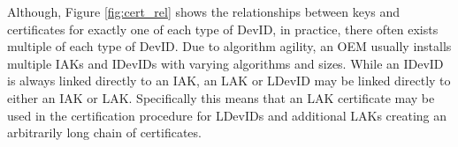 \vspace{2em}
Although, Figure \ref{fig:cert_rel} shows the relationships between keys and certificates for exactly one of each type of DevID, in practice, there often exists multiple of each type of DevID. Due to algorithm agility, an OEM usually installs multiple IAKs and IDevIDs with varying algorithms and sizes. While an IDevID is always linked directly to an IAK, an LAK or LDevID may be linked directly to either an IAK or LAK. Specifically this means that an LAK certificate may be used in the certification procedure for LDevIDs and additional LAKs creating an arbitrarily long chain of certificates. 

